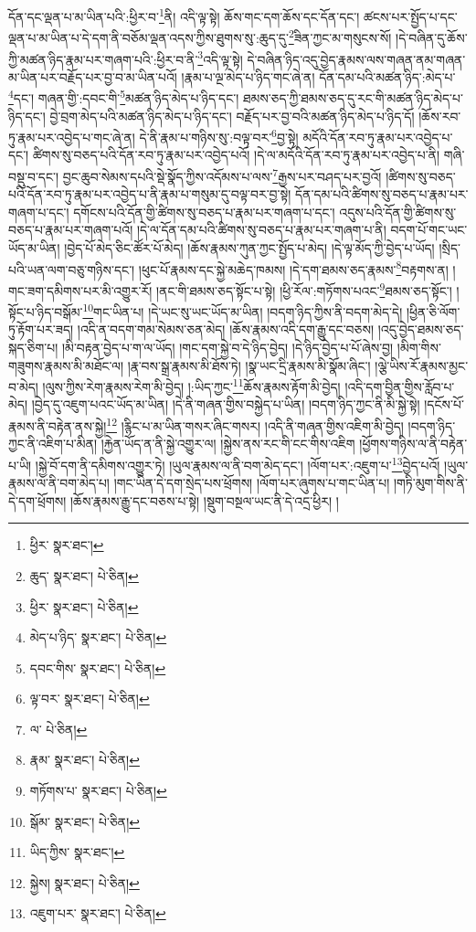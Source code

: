 དོན་དང་ལྡན་པ་མ་ཡིན་པའི་:ཕྱིར་བ་\footnote{ཕྱིར་  སྣར་ཐང་། }ནི། འདི་ལྟ་སྟེ། ཆོས་གང་དག་ཆོས་དང་དོན་དང་། ཚངས་པར་སྤྱོད་པ་དང་ལྡན་པ་མ་ཡིན་པ་དེ་དག་ནི་བཅོམ་ལྡན་འདས་ཀྱིས་ཐུགས་སུ་:ཆུད་དུ་\footnote{ཆུད་  སྣར་ཐང་།  པེ་ཅིན། }ཟིན་ཀྱང་མ་གསུངས་སོ། །དེ་བཞིན་དུ་ཆོས་ཀྱི་མཚན་ཉིད་རྣམ་པར་གཞག་པའི་:ཕྱིར་བ་ནི་\footnote{ཕྱིར་  སྣར་ཐང་།  པེ་ཅིན། }འདི་ལྟ་སྟེ། དེ་བཞིན་ཉིད་འདུ་བྱེད་རྣམས་ལས་གཞན་ནམ་གཞན་མ་ཡིན་པར་བརྗོད་པར་བྱ་བ་མ་ཡིན་པའོ། །རྣམ་པ་ལྔ་མེད་པ་ཉིད་གང་ཞེ་ན། དོན་དམ་པའི་མཚན་ཉིད་:མེད་པ་\footnote{མེད་པ་ཉིད་  སྣར་ཐང་།  པེ་ཅིན། }དང་། གཞན་གྱི་:དབང་གི་\footnote{དབང་གིས་  སྣར་ཐང་།  པེ་ཅིན། }མཚན་ཉིད་མེད་པ་ཉིད་དང་། ཐམས་ཅད་ཀྱི་ཐམས་ཅད་དུ་རང་གི་མཚན་ཉིད་མེད་པ་ཉིད་དང་། བྱེ་བྲག་མེད་པའི་མཚན་ཉིད་མེད་པ་ཉིད་དང་། བརྗོད་པར་བྱ་བའི་མཚན་ཉིད་མེད་པ་ཉིད་དོ། །ཆོས་རབ་ཏུ་རྣམ་པར་འབྱེད་པ་གང་ཞེ་ན། དེ་ནི་རྣམ་པ་གཉིས་སུ་:བལྟ་བར་\footnote{ལྟ་བར་  སྣར་ཐང་།  པེ་ཅིན། }བྱ་སྟེ། མདོའི་དོན་རབ་ཏུ་རྣམ་པར་འབྱེད་པ་དང་། ཚིགས་སུ་བཅད་པའི་དོན་རབ་ཏུ་རྣམ་པར་འབྱེད་པའོ། །དེ་ལ་མདོའི་དོན་རབ་ཏུ་རྣམ་པར་འབྱེད་པ་ནི། གཞི་བསྡུ་བ་དང་། བྱང་ཆུབ་སེམས་དཔའི་སྡེ་སྣོད་ཀྱིས་འདོམས་པ་ལས་\footnote{ལ་  པེ་ཅིན། }རྒྱས་པར་བཤད་པར་བྱའོ། །ཚིགས་སུ་བཅད་པའི་དོན་རབ་ཏུ་རྣམ་པར་འབྱེད་པ་ནི་རྣམ་པ་གསུམ་དུ་བལྟ་བར་བྱ་སྟེ། དོན་དམ་པའི་ཚིགས་སུ་བཅད་པ་རྣམ་པར་གཞག་པ་དང་། དགོངས་པའི་དོན་གྱི་ཚིགས་སུ་བཅད་པ་རྣམ་པར་གཞག་པ་དང་། འདུས་པའི་དོན་གྱི་ཚིགས་སུ་བཅད་པ་རྣམ་པར་གཞག་པའོ། །དེ་ལ་དོན་དམ་པའི་ཚིགས་སུ་བཅད་པ་རྣམ་པར་གཞག་པ་ནི། བདག་པོ་གང་ཡང་ཡོད་མ་ཡིན། །བྱེད་པོ་མེད་ཅིང་ཚོར་པོ་མེད། །ཆོས་རྣམས་ཀུན་ཀྱང་སྤྱོད་པ་མེད། །དེ་ལྟ་མོད་ཀྱི་བྱེད་པ་ཡོད། །སྲིད་པའི་ཡན་ལག་བཅུ་གཉིས་དང་། །ཕུང་པོ་རྣམས་དང་སྐྱེ་མཆེད་ཁམས། །དེ་དག་ཐམས་ཅད་རྣམས་\footnote{རྣམ་  སྣར་ཐང་།  པེ་ཅིན། }བརྟགས་ན། །གང་ཟག་དམིགས་པར་མི་འགྱུར་རོ། །ནང་གི་ཐམས་ཅད་སྟོང་པ་སྟེ། །ཕྱི་རོལ་:གཏོགས་པའང་\footnote{གཏོགས་པ་  སྣར་ཐང་།  པེ་ཅིན། }ཐམས་ཅད་སྟོང་། །སྟོང་པ་ཉིད་བསྒོམ་\footnote{སྒོམ་  སྣར་ཐང་།  པེ་ཅིན། }གང་ཡིན་པ། །དེ་ཡང་སུ་ཡང་ཡོད་མ་ཡིན། །བདག་ཉིད་ཀྱིས་ནི་བདག་མེད་དེ། །ཕྱིན་ཅི་ལོག་ཏུ་རྟོག་པར་ཟད། །འདི་ན་བདག་གམ་སེམས་ཅན་མེད། །ཆོས་རྣམས་འདི་དག་རྒྱུ་དང་བཅས། །འདུ་བྱེད་ཐམས་ཅད་སྐད་ཅིག་པ། །མི་བརྟན་བྱེད་པ་ག་ལ་ཡོད། །གང་དག་སྐྱེ་བ་དེ་ཉིད་བྱེད། །དེ་ཉིད་བྱེད་པ་པོ་ཞེས་བྱ། །མིག་གིས་གཟུགས་རྣམས་མི་མཐོང་ལ། །རྣ་བས་སྒྲ་རྣམས་མི་ཐོས་ཏེ། །སྣ་ཡང་དྲི་རྣམས་མི་སྣོམ་ཞིང་། །ལྕེ་ཡིས་རོ་རྣམས་མྱང་བ་མེད། །ལུས་ཀྱིས་རེག་རྣམས་རེག་མི་བྱེད། །:ཡིད་ཀྱང་\footnote{ཡིད་ཀྱིས་  སྣར་ཐང་། }ཆོས་རྣམས་རྟོག་མི་བྱེད། །འདི་དག་བྱིན་གྱིས་རློབ་པ་མེད། །བྱེད་དུ་འཇུག་པའང་ཡོད་མ་ཡིན། །དེ་ནི་གཞན་གྱིས་བསྐྱེད་པ་ཡིན། །བདག་ཉིད་ཀྱང་ནི་མི་སྐྱེ་སྟེ། །དངོས་པོ་རྣམས་ནི་བརྟེན་ནས་སྐྱེ།\footnote{སྐྱེས།  སྣར་ཐང་།  པེ་ཅིན། } །རྙིང་པ་མ་ཡིན་གསར་ཞིང་གསར། །འདི་ནི་གཞན་གྱིས་འཇིག་མི་བྱེད། །བདག་ཉིད་ཀྱང་ནི་འཇིག་པ་མིན། །རྐྱེན་ཡོད་ན་ནི་སྐྱེ་འགྱུར་ལ། །སྐྱེས་ནས་རང་གི་ངང་གིས་འཇིག །ཕྱོགས་གཉིས་ལ་ནི་བརྟེན་པ་ཡི། །སྐྱེ་བོ་དག་ནི་དམིགས་འགྱུར་ཏེ། །ཡུལ་རྣམས་ལ་ནི་བག་མེད་དང་། །ལོག་པར་:འཇུག་པ་\footnote{འཇུག་པར་  སྣར་ཐང་།  པེ་ཅིན། }བྱེད་པའོ། །ཡུལ་རྣམས་ལ་ནི་བག་མེད་པ། །གང་ཡིན་དེ་དག་སྲེད་པས་ཕྲོགས། །ལོག་པར་ཞུགས་པ་གང་ཡིན་པ། །གཏི་མུག་གིས་ནི་དེ་དག་ཕྲོགས། །ཆོས་རྣམས་རྒྱུ་དང་བཅས་པ་སྟེ། །སྡུག་བསྔལ་ཡང་ནི་དེ་འདྲ་ཕྱིར། །
